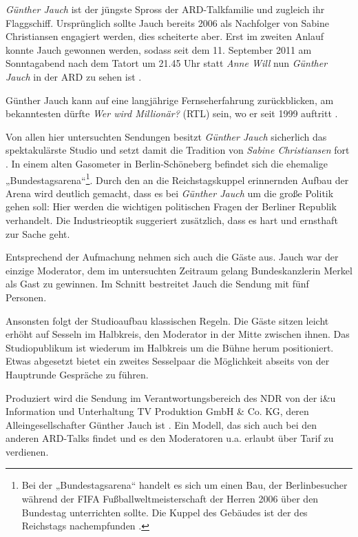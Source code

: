 \textit{Günther Jauch} ist der jüngste Spross der ARD-Talkfamilie und zugleich ihr Flaggschiff. Ursprünglich sollte Jauch bereits 2006 als Nachfolger von Sabine Christiansen engagiert werden, dies scheiterte aber. Erst im zweiten Anlauf konnte Jauch gewonnen werden, sodass seit dem 11. September 2011 am Sonntagabend nach dem Tatort um 21.45 Uhr statt \textit{Anne Will} nun \textit{Günther Jauch} in der ARD zu sehen ist \parencite[19]{gaeblerUndUnserenTaeglichen2011}.

Günther Jauch kann auf eine langjährige Fernseherfahrung zurückblicken, am bekanntesten dürfte \textit{Wer wird Millionär?} (RTL) sein, wo er seit 1999 auftritt \parencite{ardUberGuntherJaucho.J.}.

Von allen hier untersuchten Sendungen besitzt \textit{Günther Jauch} sicherlich das spektakulärste Studio und setzt damit die Tradition von \textit{Sabine Christiansen} fort \parencite[355]{nielandTalkshowisierungWahlkampfesAnalyse2002}. In einem alten Gasometer in Berlin-Schöneberg befindet sich die ehemalige „Bundestagsarena“\footnote{Bei der „Bundestagsarena“ handelt es sich um einen Bau, der Berlinbesucher während der FIFA Fußballweltmeisterschaft der Herren 2006 über den Bundestag unterrichten sollte. Die Kuppel des Gebäudes ist der des Reichstags nachempfunden \parencite{deutscherbundestagBundestagsarenaBesucherUndo.J.}.}. Durch den an die Reichstagskuppel erinnernden Aufbau der Arena wird deutlich gemacht, dass es bei \textit{Günther Jauch} um die große Politik gehen soll: Hier werden die wichtigen politischen Fragen der Berliner Republik verhandelt. Die Industrieoptik suggeriert zusätzlich, dass es hart und ernsthaft zur Sache geht.

Entsprechend der Aufmachung nehmen sich auch die Gäste aus. Jauch war der einzige Moderator, dem im untersuchten Zeitraum gelang Bundeskanzlerin Merkel als Gast zu gewinnen. Im Schnitt bestreitet Jauch die Sendung mit fünf Personen.

Ansonsten folgt der Studioaufbau klassischen Regeln. Die Gäste sitzen leicht erhöht auf Sesseln im Halbkreis, den Moderator in der Mitte zwischen ihnen. Das Studiopublikum ist wiederum im Halbkreis um die Bühne herum positioniert. Etwas abgesetzt bietet ein zweites Sesselpaar die Möglichkeit abseits von der Hauptrunde Gespräche zu führen.

Produziert wird die Sendung im Verantwortungsbereich des NDR von der i\&u Information und Unterhaltung TV Produktion GmbH \& Co. KG, deren Alleingesellschafter Günther Jauch ist \parencite{iutvProfilo.J.}. Ein Modell, das sich auch bei den anderen ARD-Talks findet und es den Moderatoren u.a. erlaubt über Tarif zu verdienen.

